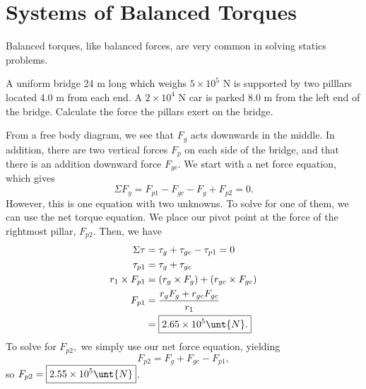\documentclass[11pt]{article}
\begin{document}
\section{Systems of Balanced Torques}
Balanced torques, like balanced forces, are very common in solving statics problems.
\begin{example}
	A uniform bridge 24 m long which weighs $5\times 10^5$ N is supported by two pilllars located 4.0 m from each end. A $2 \times 10^4$ N car is parked 8.0 m from the left end of the bridge. Calculate the force the pillars exert on the bridge.
\end{example}
\begin{solution}
	From a free body diagram, we see that $F_g$ acts downwards in the middle. In addition, there are two vertical forces $F_p$ on each side of the bridge, and that there is an addition downward force $F_{gc}$. We start with a net force equation, which gives
	\[\Sigma F_y = F_{p1} - F_{gc} - F_g + F_{p2} = 0.\]
	However, this is one equation with two unknowns. To solve for one of them, we can use the net torque equation. We place our pivot point  at the force of the rightmost pillar, $F_{p2}$. Then, we have
	\begin{align*}
		\Sigma \tau &= \tau_{g} + \tau_{gc} - \tau_{p1} = 0\\
		\tau_{p1} &= \tau_{g} + \tau_{gc} \\
		r_1\times F_{p1} &= (r_g \times F_g) + (r_{gc}\times F_{gc}) \\
		F_{p1} &= \frac{r_gF_g + r_{gc}F_{gc}}{r_1} \\
		&= \boxed{2.65 \times 10^{5}\unt{N}.}
	\end{align*}
	To solve for $F_{p2},$ we simply use our net force equation, yielding
	\[F_{p2} = F_g + F_{gc} - F_{p1},\]
	so $F_{p2} = \boxed{2.55\times 10^5\unt{N}}$.
\end{solution}
\end{document}
